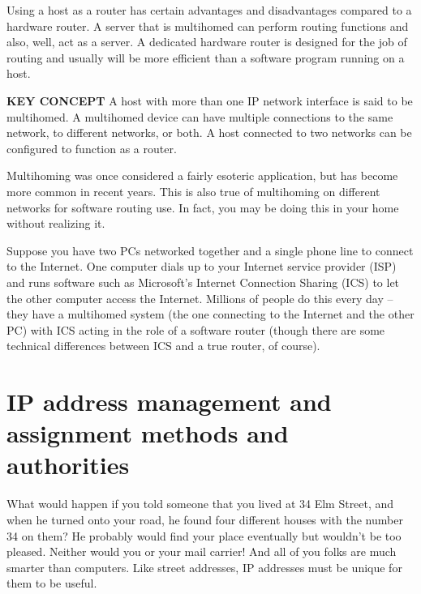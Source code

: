 \documentclass[b5paper,11pt]{memoir}
\begin{document}
Using a host as a router has certain advantages and disadvantages
compared to a hardware router. A server that is multihomed can perform
routing functions and also, well, act as a server. A dedicated hardware
router is designed for the job of routing and usually will be more
efficient than a software program running on a host.


{\textbf{KEY CONCEPT}} A host with more than one IP network interface is
said to be multihomed. A multihomed device can have multiple connections
to the same network, to different networks, or both. A host connected to
two networks can be configured to function as a router.

Multihoming was once considered a fairly esoteric application, but has
become more common in recent years. This is also true of multihoming on
different networks for software routing use. In fact, you may be doing
this in your home without realizing it.

Suppose you have two PCs networked together and a single phone line to
connect to the Internet. One computer dials up to your Internet service
provider (ISP) and runs software such as Microsoft's
\protect\hypertarget{ch16s05.htmlux5cux23idx-CHP-16-0672}{}{}Internet
Connection Sharing
(\protect\hypertarget{ch16s05.htmlux5cux23idx-CHP-16-0673}{}{}ICS) to
let the other computer access the Internet. Millions of people do this
every day -- they have a multihomed system (the one connecting to the
Internet and the other PC) with ICS acting in the role of a software
router (though there are some technical differences between ICS and a
true router, of course).


\section{IP address management and assignment methods and authorities}
What would happen if you told someone that you lived at 34 Elm Street, and when he
turned onto your road, he found four different houses with the number 34
on them? He probably would find your place eventually but wouldn't be
too pleased. Neither would you or your mail carrier! And all of you
folks are much smarter than computers. Like street addresses, IP
addresses must be unique for them to be useful.

\protect\hypertarget{ch16s06.htmlux5cux23multihomed_devices_on_an_ip_internetwork}{}{}

\protect\hypertarget{ch16s06.htmlux5cux23I_mediaobject2_d1e16338}{}{}
\end{document}
